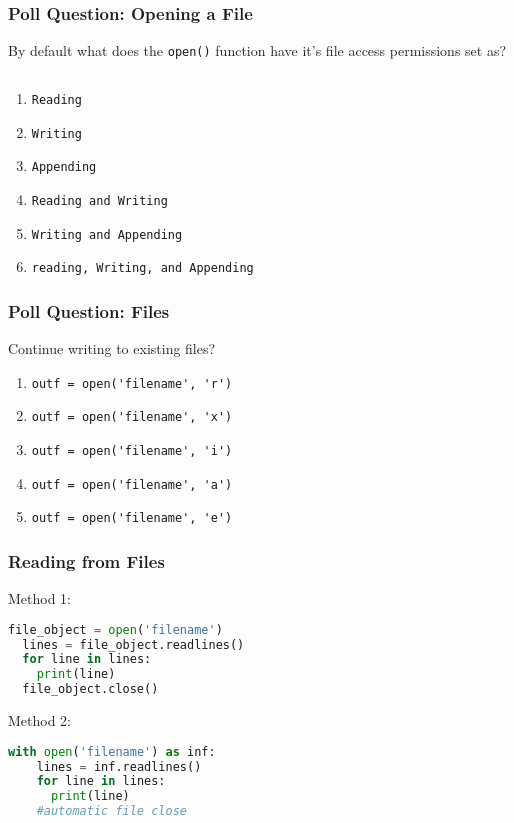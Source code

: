 \documentclass{beamer}
\begin{document}
%
%
\begin{frame}[fragile]
  \frametitle{Poll Question: Opening a File}
  By default what does the \lstinline|open()| function have it's file access permissions set as?
  \begin{lstlisting}[language=Python, autogobble]
  \end{lstlisting}
  \vfill
  \begin{enumerate}[A]
    \item \lstinline|Reading|
    \item \lstinline|Writing|
    \item \lstinline|Appending|
    \item \lstinline|Reading and Writing|
    \item \lstinline|Writing and Appending|
    \item \lstinline|reading, Writing, and Appending|
  \end{enumerate}
\end{frame}

%
%
\begin{frame}[fragile]
  \frametitle{Poll Question: Files}
  Continue writing to existing files?
  \vfill
  \begin{enumerate}[A]
    \item \lstinline|outf = open('filename', 'r')|
    \item \lstinline|outf = open('filename', 'x')|
    \item \lstinline|outf = open('filename', 'i')|
    \item \lstinline|outf = open('filename', 'a')|
    \item \lstinline|outf = open('filename', 'e')|
  \end{enumerate}
\end{frame}

%
%
\begin{frame}[fragile]
  \frametitle{Reading from Files}
  Method 1:
  \begin{lstlisting}[language=Python, autogobble]
  file_object = open('filename')
  lines = file_object.readlines()
  for line in lines:
    print(line)
  file_object.close()
  \end{lstlisting}
  \vfill
  Method 2:
  \begin{lstlisting}[language=Python, autogobble]
  with open('filename') as inf:
    lines = inf.readlines()
    for line in lines:
      print(line)
    #automatic file close
  \end{lstlisting}
\end{frame}
\end{document}
